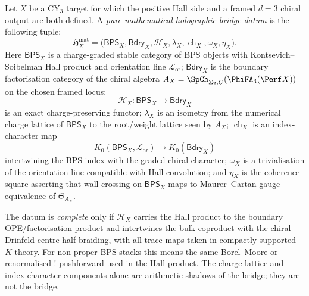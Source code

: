 \begin{definition}
\label{def:pure-math-holographic-bridge-datum}
Let $X$ be a CY$_3$ target for which the positive Hall side and a
framed $d=3$ chiral output are both defined. A \emph{pure mathematical
holographic bridge datum} is the following tuple:
\[
 \mathfrak H_X^{\mathrm{mat}}
 =
 \bigl(\mathsf{BPS}_X,\mathsf{Bdry}_X,\mathcal H_X,
 \lambda_X,\operatorname{ch}_X,\omega_X,\eta_X\bigr).
\]
Here $\mathsf{BPS}_X$ is a charge-graded stable category of BPS objects
with Kontsevich--Soibelman Hall product and orientation line
$\mathcal L_{\mathrm{or}}$; $\mathsf{Bdry}_X$ is the boundary
factorisation category of the chiral algebra
$A_X=\SpCh_{\Sigma_2,C}(\PhiFA_3(\Perf X))$ on the chosen framed locus;
\[
 \mathcal H_X\colon \mathsf{BPS}_X \longrightarrow \mathsf{Bdry}_X
\]
is an exact charge-preserving functor; $\lambda_X$ is an isometry from
the numerical charge lattice of $\mathsf{BPS}_X$ to the root/weight
lattice seen by $A_X$; $\operatorname{ch}_X$ is an index-character
map
\[
 K_0(\mathsf{BPS}_X,\mathcal L_{\mathrm{or}})
 \longrightarrow
 K_0(\mathsf{Bdry}_X)
\]
intertwining the BPS index with the graded chiral character;
$\omega_X$ is a trivialisation of the orientation line compatible with
Hall convolution; and $\eta_X$ is the coherence square asserting that
wall-crossing on $\mathsf{BPS}_X$ maps to Maurer--Cartan gauge
equivalence of $\Theta_{A_X}$.

The datum is \emph{complete} only if $\mathcal H_X$ carries the Hall
product to the boundary OPE/factorisation product and intertwines the
bulk coproduct with the chiral Drinfeld-centre half-braiding, with all
trace maps taken in compactly supported $K$-theory. For non-proper
BPS stacks this means the same Borel--Moore or renormalised
$!$-pushforward used in the Hall product. The charge lattice and
index-character components alone are arithmetic shadows of the bridge;
they are not the bridge.
\end{definition}


